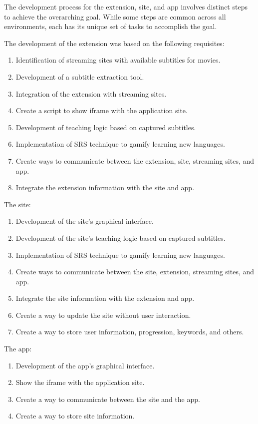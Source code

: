 \documentclass[12pt]{article}
\begin{document}
The development process for the extension, site, and app involves distinct steps to achieve the overarching goal. While some steps are common across all environments, each has its unique set of tasks to accomplish the goal.


The development of the extension was based on the following requisites:  
\begin{enumerate}
\item Identification of streaming sites with available subtitles for movies.
\item Development of a subtitle extraction tool.
\item Integration of the extension with streaming sites.
\item Create a script to show iframe with the application site.
\item Development of teaching logic based on captured subtitles.
\item Implementation of SRS technique to gamify learning new languages.
\item Create ways to communicate between the extension, site, streaming sites, and app.
\item Integrate the extension information with the site and app.
\end{enumerate}
The site: 

\begin{enumerate}
\item Development of the site's graphical interface.
\item Development of the site's teaching logic based on captured subtitles.
\item Implementation of SRS technique to gamify learning new languages.
\item Create ways to communicate between the site, extension, streaming sites, and app.
\item Integrate the site information with the extension and app.
\item Create a way to update the site without user interaction.
\item Create a way to store user information, progression, keywords, and others.
\end{enumerate}
The app:

\begin{enumerate}
\item Development of the app's graphical interface.
\item Show the iframe with the application site.
\item Create a way to communicate between the site and the app.
\item Create a way to store site information.
\end{enumerate}
\end{document}
